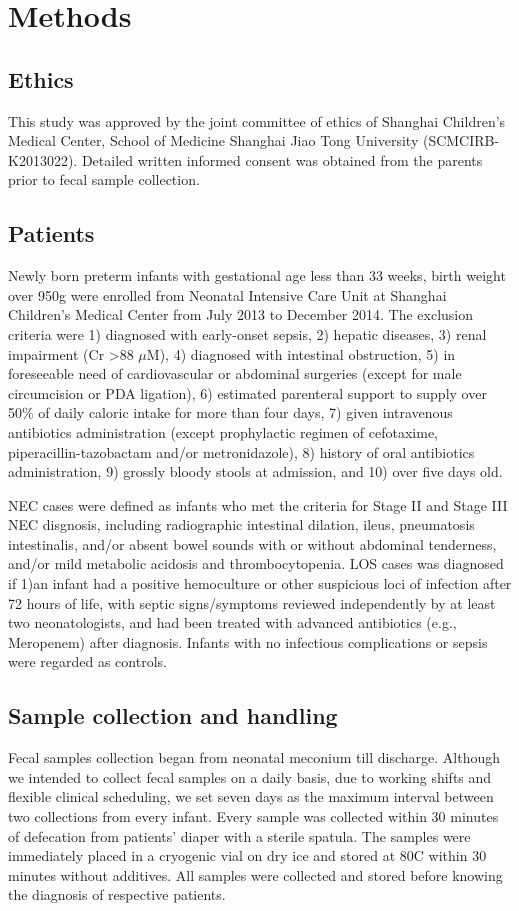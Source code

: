 \documentclass[fleqn,10pt,lineno]{wlpeerj} %
\begin{document}
\section*{Methods}
  \subsection*{Ethics}
  This study was approved by the joint committee of ethics of Shanghai Children’s Medical Center, School of Medicine Shanghai Jiao Tong University (SCMCIRB-K2013022). Detailed written informed consent was obtained from the parents prior to fecal sample collection.

  \subsection*{Patients}
  Newly born preterm infants with gestational age less than 33 weeks, birth weight over 950g were enrolled from Neonatal Intensive Care Unit at Shanghai Children’s Medical Center from July 2013 to December 2014. The exclusion criteria were 1) diagnosed with early-onset sepsis, 2) hepatic diseases, 3) renal impairment (Cr \textgreater 88 $\mu$M), 4) diagnosed with intestinal obstruction, 5) in foreseeable need of cardiovascular or abdominal surgeries (except for male circumcision or PDA ligation), 6) estimated parenteral support to supply over 50\% of daily caloric intake for more than four days, 7) given intravenous antibiotics administration (except prophylactic regimen of cefotaxime, piperacillin-tazobactam and/or metronidazole), 8) history of oral antibiotics administration, 9) grossly bloody stools at admission, and 10) over five days old.

  NEC cases were defined as infants who met the criteria for Stage II and Stage III NEC disgnosis\citep{bell1978neonatal}, including radiographic intestinal dilation, ileus, pneumatosis intestinalis, and/or absent bowel sounds with or without abdominal tenderness, and/or mild metabolic acidosis and thrombocytopenia. LOS cases was diagnosed if 1)an infant had a positive hemoculture or other suspicious loci of infection after 72 hours of life, with septic signs/symptoms reviewed independently by at least two neonatologists, and had been treated with advanced antibiotics (e.g., Meropenem) after diagnosis. Infants with no infectious complications or sepsis were regarded as controls.

  \subsection*{Sample collection and handling}
  Fecal samples collection began from neonatal meconium till discharge.   Although we intended to collect fecal samples on a daily basis, due to working shifts and flexible clinical scheduling, we set seven days as the maximum interval between two collections from every infant. Every sample was collected within 30 minutes of defecation from patients' diaper with a sterile spatula. The samples were immediately placed in a cryogenic vial on dry ice and stored at 80\textdegree{}C within 30 minutes without additives. All samples were collected and stored before knowing the diagnosis of respective patients.
\end{document}
